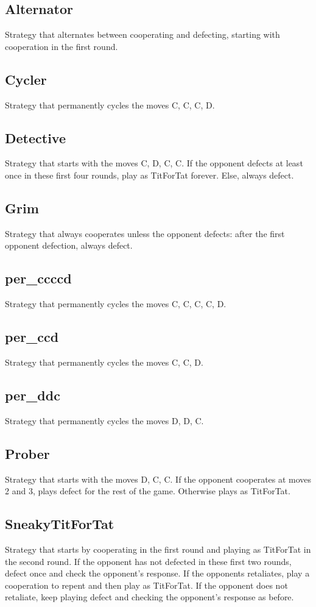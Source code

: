 \documentclass[12pt]{article}
\begin{document}
\subsection{Alternator}
Strategy that alternates between cooperating and defecting, starting with cooperation in the first round.

\subsection{Cycler}
Strategy that permanently cycles the moves C, C, C, D.

\subsection{Detective}
Strategy that starts with the moves C, D, C, C. If the opponent defects at least once in these first four rounds, play as TitForTat forever. Else, always defect.

\subsection{Grim}
Strategy that always cooperates unless the opponent defects: after the first opponent defection, always defect.

\subsection{per\_ccccd}
Strategy that permanently cycles the moves C, C, C, C, D.

\subsection{per\_ccd}
Strategy that permanently cycles the moves C, C, D.

\subsection{per\_ddc}
Strategy that permanently cycles the moves D, D, C.

\subsection{Prober}
Strategy that starts with the moves D, C, C. If the opponent cooperates at moves 2 and 3, plays defect for the rest of the game. Otherwise plays as TitForTat.

\subsection{SneakyTitForTat}
Strategy that starts by cooperating in the first round and playing as TitForTat in the second round. If the opponent has not defected in these first two rounds, defect once and check the opponent's response. If the opponents retaliates, play a cooperation to repent and then play as TitForTat. If the opponent does not retaliate, keep playing defect and checking the opponent's response as before.
\end{document}
